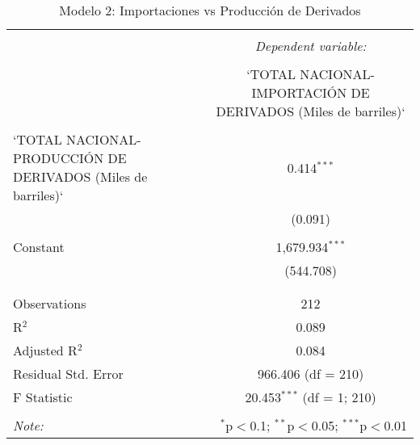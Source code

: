 
\begin{table}[!htbp] \centering 
  \caption{Modelo 2: Importaciones vs Producción de Derivados} 
  \label{} 
\begin{tabular}{@{\extracolsep{5pt}}lc} 
\\[-1.8ex]\hline 
\hline \\[-1.8ex] 
 & \multicolumn{1}{c}{\textit{Dependent variable:}} \\ 
\cline{2-2} 
\\[-1.8ex] & `TOTAL NACIONAL-IMPORTACIÓN DE DERIVADOS (Miles de barriles)` \\ 
\hline \\[-1.8ex] 
 `TOTAL NACIONAL-PRODUCCIÓN DE DERIVADOS (Miles de barriles)` & 0.414$^{***}$ \\ 
  & (0.091) \\ 
  & \\ 
 Constant & 1,679.934$^{***}$ \\ 
  & (544.708) \\ 
  & \\ 
\hline \\[-1.8ex] 
Observations & 212 \\ 
R$^{2}$ & 0.089 \\ 
Adjusted R$^{2}$ & 0.084 \\ 
Residual Std. Error & 966.406 (df = 210) \\ 
F Statistic & 20.453$^{***}$ (df = 1; 210) \\ 
\hline 
\hline \\[-1.8ex] 
\textit{Note:}  & \multicolumn{1}{r}{$^{*}$p$<$0.1; $^{**}$p$<$0.05; $^{***}$p$<$0.01} \\ 
\end{tabular} 
\end{table} 

